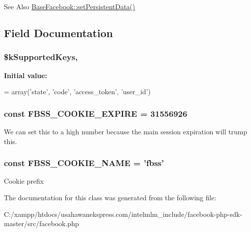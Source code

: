 \begin{DoxySeeAlso}{See Also}
\hyperlink{class_base_facebook_a7c395efe8594a2afd06b462e8858fee8}{Base\-Facebook\-::set\-Persistent\-Data()} 
\end{DoxySeeAlso}


\subsection{Field Documentation}
\hypertarget{class_facebook_a4ffada7b9a6b59371a32df158bc760ac}{
\subsubsection[{\$k\-Supported\-Keys}]{\setlength{\rightskip}{0pt plus 5cm}\$k\-Supported\-Keys\hspace{0.3cm}{\ttfamily [static]}, {\ttfamily [protected]}}}\label{class_facebook_a4ffada7b9a6b59371a32df158bc760ac}
{\bfseries Initial value\-:}
\begin{DoxyCode}
=
    array(\textcolor{stringliteral}{'state'}, \textcolor{stringliteral}{'code'}, \textcolor{stringliteral}{'access\_token'}, \textcolor{stringliteral}{'user\_id'})
\end{DoxyCode}
\hypertarget{class_facebook_a53f51f4f29c99753c6e3de7c6b0af302}{
\subsubsection[{F\-B\-S\-S\-\_\-\-C\-O\-O\-K\-I\-E\-\_\-\-E\-X\-P\-I\-R\-E}]{\setlength{\rightskip}{0pt plus 5cm}const F\-B\-S\-S\-\_\-\-C\-O\-O\-K\-I\-E\-\_\-\-E\-X\-P\-I\-R\-E = 31556926}}\label{class_facebook_a53f51f4f29c99753c6e3de7c6b0af302}
We can set this to a high number because the main session expiration will trump this. \hypertarget{class_facebook_a7fe11167b435307400289ab8a97ddd89}{
\subsubsection[{F\-B\-S\-S\-\_\-\-C\-O\-O\-K\-I\-E\-\_\-\-N\-A\-M\-E}]{\setlength{\rightskip}{0pt plus 5cm}const F\-B\-S\-S\-\_\-\-C\-O\-O\-K\-I\-E\-\_\-\-N\-A\-M\-E = 'fbss'}}\label{class_facebook_a7fe11167b435307400289ab8a97ddd89}
Cookie prefix 

The documentation for this class was generated from the following file\-:\begin{DoxyCompactItemize}
\item 
C\-:/xampp/htdocs/usahawanekspress.\-com/intelmlm\-\_\-include/facebook-\/php-\/sdk-\/master/src/facebook.\-php\end{DoxyCompactItemize}
